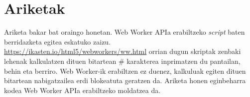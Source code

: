 \section{Ariketak}
Ariketa bakar bat oraingo honetan. Web Worker APIa erabiltzeko \textit{script} baten berridazketa egitea eskatuko zaizu.  \href{https://ikasten.io/html5/webworkers/ww.html}{https://ikasten.io/html5/webworkers/ww.html} orrian dugun skriptak zenbaki lehenak kalkulatzen dituen bitartean \# karakterea inprimatzen du pantailan, behin eta berriro. Web Worker-ik erabiltzen ez duenez, kalkuluak egiten dituen bitartean nabigatzailea erdi blokeatuta geratzen da. Ariketa honen
eginbeharra kodea Web Worker APIa erabiltzeko moldatzea da.



